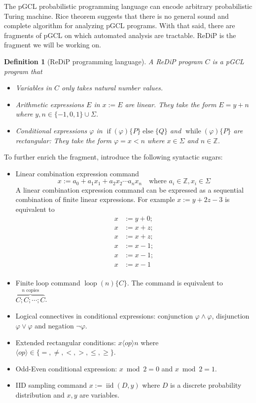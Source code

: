 \documentclass[a4paper]{article}
\DeclareMathOperator*{\iid}{iid}
\newtheorem{definition}[theorem]{Definition}
\begin{document}
The pGCL probabilistic programming language can encode arbitrary probabilistic Turing machine. Rice theorem suggests that there is no general sound and complete algorithm for analyzing pGCL programs.
With that said, there are fragments of pGCL on which automated analysis are tractable. ReDiP is the fragment we will be working on.
\begin{definition}[ReDiP programming language]
	A ReDiP program \(C\) is a pGCL program that
	\begin{itemize}
		\item Variables in \(C\) only takes natural number values.
		\item Arithmetic expressions \(E\) in \(x:=E\) are linear.
		      They take the form \( E = y + n \)
		      where \( y,n \in \{-1,0,1\}\cup\Sigma \).
		\item Conditional expressions \(\varphi\) in
		      \(\operatorname{if}(\varphi)\{P\}\operatorname{else}\{Q\}\)
		      and
		      \(\operatorname{while}(\varphi)\{P\}\)
		      are rectangular:
		      They take the form \(\varphi = x < n\)
		      where \(x \in \Sigma\) and \(n \in \mathbb{Z}\).
	\end{itemize}
\end{definition}
To further enrich the fragment, introduce the following syntactic sugars:
\begin{itemize}
	\item Linear combination expression command
	      \[
		      x := a_0 + a_1 x_1 + a_2 x_2 \cdots a_n x_n
		      \quad
		      \text{where }
		      a_i \in \mathbb{Z},
		      x_i \in \Sigma
	      \]
	      A linear combination expression command can be expressed as a sequential combination of finite linear expressions.
	      For example \(x := y + 2z - 3\) is equivalent to
	      \[
		      \begin{aligned}
			      x & := y + 0; \\
			      x & := x + z; \\
			      x & := x + z; \\
			      x & := x - 1; \\
			      x & := x - 1; \\
			      x & := x - 1  \\
		      \end{aligned}
	      \]
	\item Finite loop command \(\operatorname{loop}(n)\{C\}\).
	      The command is equivalent to \(\overbrace{C;C;\cdots;C}^{n \text{ copies}}\).
	\item Logical connectives in conditional expressions: conjunction \(\varphi \land \varphi\), disjunction \(\varphi\lor\varphi\) and negation \(\lnot\varphi\).
	\item Extended rectangular conditions: \(x \langle op \rangle n\) where \(\langle op \rangle \in \{=,\neq,<,>,\leq,\geq\}\).
	\item Odd-Even conditional expression: \(x\bmod 2=0\) and \(x\bmod 2=1\).
	\item IID sampling command \(x := \iid(D,y)\) where \(D\) is a discrete probability distribution and \(x,y\) are variables.
\end{itemize}
\end{document}
